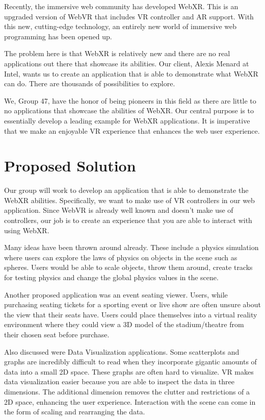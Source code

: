 \documentclass[10pt,letterpaper,draftclsnofoot,onecolumn]{IEEEtran}
\begin{document}
\begin{singlespace}
Recently, the immersive web community has developed WebXR. This is an upgraded version of WebVR that includes VR controller and AR support. With this new, cutting-edge technology, an entirely new world of immersive web programming has been opened up.

The problem here is that WebXR is relatively new and there are no real applications out there that showcase its abilities. Our client, Alexis Menard at Intel, wants us to create an application that is able to demonstrate what WebXR can do. There are thousands of possibilities to explore.

We, Group 47, have the honor of being pioneers in this field as there are little to no applications that showcase the abilities of WebXR. Our central purpose is to essentially develop a leading example for WebXR applications. It is imperative that we make an enjoyable VR experience that enhances the web user experience.

\section{Proposed Solution}
Our group will work to develop an application that is able to demonstrate the WebXR abilities. Specifically, we want to make use of VR controllers in our web application. Since WebVR is already well known and doesn’t make use of controllers, our job is to create an experience that you are able to interact with using WebXR.

Many ideas have been thrown around already. These include a physics simulation where users can explore the laws of physics on objects in the scene such as spheres. Users would be able to scale objects, throw them around, create tracks for testing physics and change the global physics values in the scene.

Another proposed application was an event seating viewer. Users, while purchasing seating tickets for a sporting event or live show are often unsure about the view that their seats have. Users could place themselves into a virtual reality environment where they could view a 3D model of the stadium/theatre from their chosen seat before purchase.

Also discussed were Data Visualization applications. Some scatterplots and graphs are incredibly difficult to read when they incorporate gigantic amounts of data into a small 2D space. These graphs are often hard to visualize. VR makes data visualization easier because you are able to inspect the data in three dimensions. The additional dimension removes the clutter and restrictions of a 2D space, enhancing the user experience. Interaction with the scene can come in the form of scaling and rearranging the data.


\end{singlespace}
\end{document}
